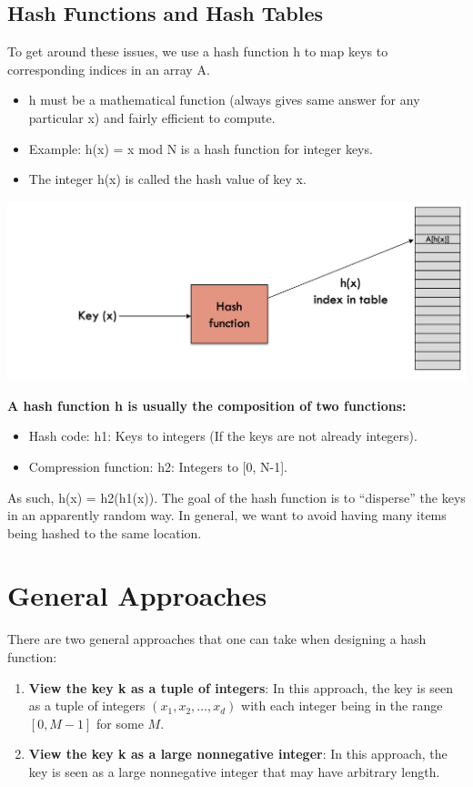 \documentclass[12pt]{article}
\newcommand{\1}{\space \quad}
\newcommand{\2}{\quad \quad \quad}
\newcommand{\3}{\quad \quad \quad \quad \space}
\newcommand{\4}{\quad \quad \quad \quad \quad \quad}
\begin{document}
\subsection{Hash Functions and Hash Tables}
To get around these issues, we use a hash function h to map keys to corresponding indices in an array A.
\begin{itemize}
  \item h must be a mathematical function (always gives same answer for any particular x) and fairly efficient to compute.
  \item Example: h(x) = x mod N is a hash function for integer keys.
  \item The integer h(x) is called the hash value of key x.
\end{itemize}
\includegraphics[width=\textwidth]{image12.png}

\textbf{A hash function h is usually the composition of two functions:}
\begin{itemize}
  \item Hash code: h1: Keys to integers (If the keys are not already integers).
  \item Compression function: h2: Integers to [0, N-1].
\end{itemize}
As such, h(x) = h2(h1(x)). The goal of the hash function is to “disperse” the keys in an apparently random way. In general, we want to 
avoid having many items being hashed to the same location.

\section{General Approaches}
There are two general approaches that one can take when designing a hash function:

\begin{enumerate}
\item \textbf{View the key k as a tuple of integers}: In this approach, the key is seen as a tuple of integers $(x_1, x_2, \ldots, x_d)$ with each integer being in the range $[0, M-1]$ for some $M$.
\item \textbf{View the key k as a large nonnegative integer}: In this approach, the key is seen as a large nonnegative integer that may have arbitrary length.
\end{enumerate}
\end{document}
